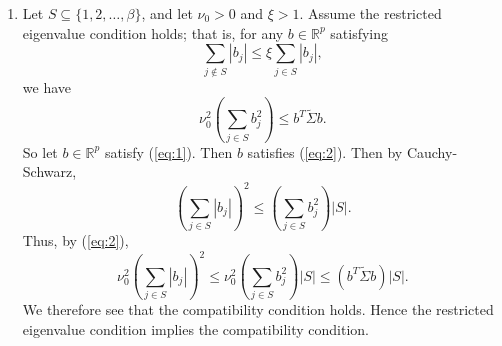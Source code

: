 \documentclass[12pt]{article}
\newcommand{\E}{\mathrm{E}}
\begin{document}
\begin{enumerate}
(a) $\implies$ (c). Let $p \geq 1$. Since $\E(X-\mu) = 0$, the result proven in the lectures implies that
\begin{equation*}
[\E(|X-\mu|^p)]^{1/p} \leq K_2' \sqrt{p}
\end{equation*}
for some $K_2' > 0$. Thus by Minkowski's Inequality,
\begin{align*}
[\E(|X|^p)]^{1/p} &= [\E(|(X - \mu) + \mu|^p)]^{1/p} \leq [\E(|X - \mu|^p)]^{1/p} + [\E(|\mu|^p)]^{1/p} \\
&= [\E(|X - \mu|^p)]^{1/p} + |\mu| \leq K_2' \sqrt{p} + |\mu| \\
&\leq K_2' \sqrt{p} + |\mu| \sqrt{p} = (K_2' + \mu) \sqrt{p} = K_2 \sqrt{p},
\end{align*}
where $K_2 = K_2' + |\mu| > 0$.

\item
Let $S \subseteq \{1, 2, \ldots, \beta\}$, and let $\nu_0 > 0$ and $\xi > 1$. Assume the restricted eigenvalue condition holds; that is, for any $b \in \mathbb{R}^p$ satisfying
\begin{equation} \label{eq:1}
\sum_{j \not \in S} |b_j| \leq \xi \sum_{j \in S} |b_j|,
\end{equation}
we have
\begin{equation} \label{eq:2}
\nu_0^2 \left(\sum_{j \in S} b_j^2\right) \leq b^T \widetilde{\Sigma} b.
\end{equation}
So let $b \in \mathbb{R}^p$ satisfy (\ref{eq:1}). Then $b$ satisfies (\ref{eq:2}). Then by Cauchy-Schwarz,
\begin{equation*}
\left(\sum_{j \in S} |b_j|\right)^2 \leq \left(\sum_{j \in S} b_j^2\right) |S|.
\end{equation*}
Thus, by (\ref{eq:2}),
\begin{equation*}
\nu_0^2 \left(\sum_{j \in S} |b_j|\right)^2 \leq \nu_0^2 \left(\sum_{j \in S} b_j^2\right) |S| \leq (b^T \widetilde{\Sigma} b) |S|.
\end{equation*}
We therefore see that the compatibility condition holds. Hence the restricted eigenvalue condition implies the compatibility condition.


\end{enumerate}
\end{document}
